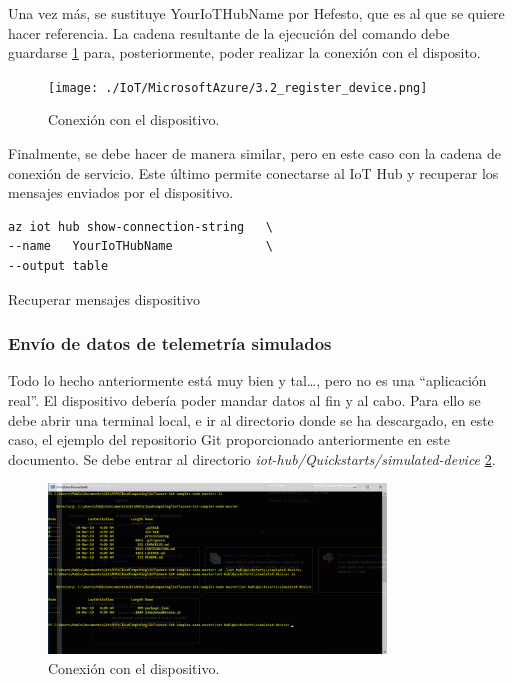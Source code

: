 \documentclass[english,runningheads,a4paper]{llncs}[2018/03/10]
\begin{document}
Una vez más, se sustituye YourIoTHubName por Hefesto, que es al que se quiere
hacer referencia. La cadena resultante de la ejecución del comando debe 
guardarse \hyperref[constring]{\ref{constring}} para, posteriormente, poder 
realizar la conexión con el disposito.

\begin{figure}[h!]
 \centering
 \texttt{[image: ./IoT/MicrosoftAzure/3.2\_register\_device.png]}
 \caption{Conexión con el dispositivo.}
 \label{constring}
\end{figure}

Finalmente, se debe hacer de manera similar, pero en este caso con la cadena de
conexión de servicio. Este último permite conectarse al IoT Hub y recuperar los
mensajes enviados por el dispositivo.

\begin{listing}[htp]
\centering
    \begin{verbatim}
az iot hub show-connection-string   \
--name   YourIoTHubName             \
--output table
    \end{verbatim}
\caption{Recuperar mensajes dispositivo}
\label{consercommand}
\end{listing}

\subsubsection{Envío de datos de telemetría simulados}

Todo lo hecho anteriormente está muy bien y tal\ldots, pero no es una
``aplicación real''. El dispositivo debería poder mandar datos al fin y al cabo.
Para ello se debe abrir una terminal local, e ir al directorio donde se ha
descargado, en este caso, el ejemplo del repositorio Git proporcionado
anteriormente en este documento. Se debe entrar al directorio
\textit{iot-hub/Quickstarts/simulated-device}
\hyperref[directory]{\ref{directory}}.

\begin{figure}[h!]
 \centering
 \includegraphics[width=0.8\textwidth]{./IoT/MicrosoftAzure/4-1_send_simulated_telemetry.png}
 \caption{Conexión con el dispositivo.}
 \label{directory}
\end{figure}
\end{document}
